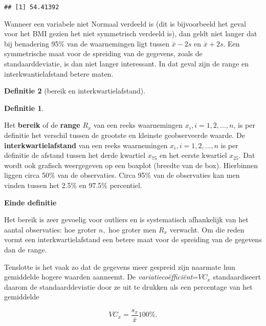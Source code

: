 \documentclass[
  12pt,dutch,coursenotes]{book}
\theoremstyle{definition}
\newtheorem{definition}{Definitie}[chapter]
\theoremstyle{definition}
\theoremstyle{definition}
\theoremstyle{remark}
\begin{document}
\begin{verbatim}
## [1] 54.41392
\end{verbatim}

Wanneer een variabele niet Normaal verdeeld is (dit is bijvoorbeeld het
geval voor het BMI gezien het niet symmetrisch verdeeld is), dan
geldt niet langer dat bij benadering 95\% van de waarnemingen ligt tussen \(\bar{x} - 2 s\) en \(\bar{x} + 2 s\). Een symmetrische maat voor de spreiding
van de gegevens, zoals de standaarddeviatie, is dan niet langer interessant.
In dat geval zijn de range en interkwantielafstand betere maten.

\begin{definition}[bereik en interkwartielafstand]
\begin{definition}

\protect\hypertarget{def:unnamed-chunk-103}{}{\label{def:unnamed-chunk-103} \iffalse (bereik en interkwartielafstand) \fi{} }

\end{definition}
\end{definition}

Het \textbf{bereik} of de \textbf{range} \(R_x\) van een reeks waarnemingen \(x_i, i=1,2,...,n\), is per definitie het verschil tussen de grootste en
kleinste geobserveerde waarde. De \textbf{interkwartielafstand} van een
reeks waarnemingen \(x_i, i=1,2,...,n\) is per definitie de afstand tussen het derde kwartiel \(x_{75}\) en het eerste kwartiel \(x_{25}\). Dat wordt ook grafisch weergegeven op een boxplot (breedte van de box). Hierbinnen liggen circa 50\% van de observaties. Circa 95\% van de observaties kan men vinden tussen het 2.5\% en 97.5\% percentiel.

\textbf{Einde definitie}

Het bereik is zeer gevoelig voor outliers en is systematisch afhankelijk van
het aantal observaties: hoe groter \(n,\) hoe groter men \(R_x\) verwacht. Om
die reden vormt een interkwartielafstand een betere maat voor de spreiding
van de gegevens dan de range.

Tenslotte is het vaak zo dat de gegevens meer gespreid zijn naarmate hun
gemiddelde hogere waarden aanneemt. De \emph{variatiecoëfficiënt}=\(VC_x\)
standaardiseert daarom de standaarddeviatie door ze uit te drukken als een
percentage van het gemiddelde

\begin{equation*}
VC_x = \frac{s_x}{\bar{x}} 100\%.
\end{equation*}
\end{document}
